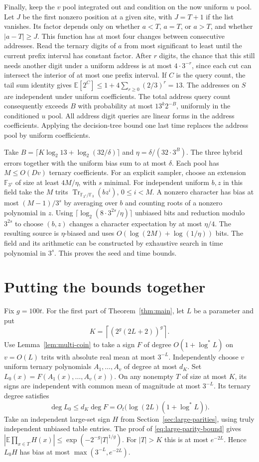 \documentclass[11pt]{article}
\begin{document}
Finally, keep the $v$ pool integrated out and condition on the now
uniform $u$ pool. Let $J$ be the first nonzero position at a given
site, with $J=T+1$ if the list vanishes. Its factor depends only on
whether $a<T$, $a=T$, or $a>T$, and whether $|a-T|\ge J$.
This function has at most four changes between consecutive addresses.
Read the ternary digits of $a$ from most significant to least until
the current prefix interval has constant factor. After $r$ digits,
the chance that this still needs another digit under a uniform address
is at most $4\cdot3^{-r}$, since each cut can intersect the interior
of at most one prefix interval. If $C$ is the query count, the tail
sum identity gives $\mathbb E[2^C]\le1+4\sum_{r\ge0}(2/3)^r=13$.
The addresses on $S$ are independent under uniform coefficients. The
total address query count consequently exceeds $B$ with probability
at most $13^k2^{-B}$, uniformly in the conditioned $u$ pool. All
address digit queries are linear forms in the address coefficients.
Applying the decision-tree bound one last time replaces the address
pool by uniform coefficients.

Take $B=\lceil K\log_2 13+\log_2(32/\delta)\rceil$ and
$\eta=\delta/(32\cdot3^B)$. The three hybrid errors together with the
uniform bias sum to at most $\delta$. Each pool has $M\le O(Dv)$
ternary coefficients. For an explicit sampler, choose an extension
$\mathbb F_{3^s}$ of size at least $4M/\eta$, with $s$ minimal.
For independent uniform $b,z$ in this field take the $M$ trits
$\operatorname{Tr}_{\mathbb F_{3^s}/\mathbb F_3}(b z^i)$,
$0\le i<M$. A nonzero character has bias at most $(M-1)/3^s$ by
averaging over $b$ and counting roots of a nonzero polynomial in $z$.
Using $\lceil\log_2(8\cdot3^{2s}/\eta)\rceil$ unbiased bits and
reduction modulo $3^{2s}$ to choose $(b,z)$ changes a character
expectation by at most $\eta/4$. The resulting source is $\eta$-biased
and uses $O(\log(2M)+\log(1/\eta))$ bits. The field and its arithmetic
can be constructed by exhaustive search in time polynomial in $3^s$.
This proves the seed and time bounds.
\section{Putting the bounds together}
\label{sec:assembly}
Fix $g=100t$. For the first part of Theorem~\ref{thm:main}, let $L$
be a parameter and put
\[
   K=\left\lceil(2^g(2L+2))^g\right\rceil .
\]
Use Lemma~\ref{lem:multi-coin} to take a sign $F$ of degree
$O(1+\log^*L)$ on $v=O(L)$ trits with absolute real mean at most
$3^{-L}$. Independently choose $v$ uniform ternary polynomials
$A_1,\ldots,A_v$ of degree at most $d_K$. Set
$L_0(x)=F(A_1(x),\ldots,A_v(x))$. On any nonempty $T$ of size
at most $K$, its signs are independent with common mean of magnitude
at most $3^{-L}$. Its ternary degree satisfies
\[
       \deg L_0\le d_K\deg F
          =O_t\big(\log(2L)(1+\log^* L)\big).
\]
Take an independent large-set sign $H$ from
Section~\ref{sec:large-parities}, using truly independent unbiased
table entries. The proof of \eqref{eq:large-parity-bound} gives
$|\mathbb E\prod_{x\in T}H(x)|\le\exp(-2^{-g}|T|^{1/g})$.
For $|T|>K$ this is at most $e^{-2L}$. Hence $L_0H$ has bias
at most $\max(3^{-L},e^{-2L})$.
\end{document}
